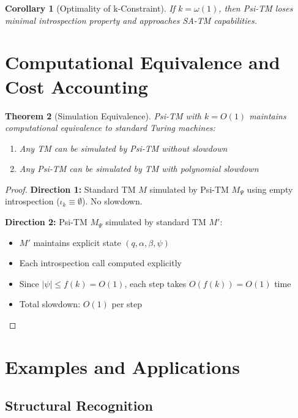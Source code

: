 \documentclass[11pt]{article}
\newtheorem{theorem}{Theorem}[section]
\newtheorem{corollary}[theorem]{Corollary}
\theoremstyle{plain}
\theoremstyle{definition}
\begin{document}
\begin{corollary}[Optimality of k-Constraint]
If $k = \omega(1)$, then Psi-TM loses minimal introspection property and approaches SA-TM capabilities.
\end{corollary}

\section{Computational Equivalence and Cost Accounting}

\begin{theorem}[Simulation Equivalence]
\label{thm:equivalence}
Psi-TM with $k = O(1)$ maintains computational equivalence to standard Turing machines:
\begin{enumerate}
\item Any TM can be simulated by Psi-TM without slowdown
\item Any Psi-TM can be simulated by TM with polynomial slowdown
\end{enumerate}
\end{theorem}

\begin{proof}
\textbf{Direction 1:} Standard TM $M$ simulated by Psi-TM $M_\Psi$ using empty introspection ($\iota_k \equiv \emptyset$). No slowdown.

\textbf{Direction 2:} Psi-TM $M_\Psi$ simulated by standard TM $M'$:
\begin{itemize}
\item $M'$ maintains explicit state $(q, \alpha, \beta, \psi)$ 
\item Each introspection call computed explicitly
\item Since $|\psi| \leq f(k) = O(1)$, each step takes $O(f(k)) = O(1)$ time
\item Total slowdown: $O(1)$ per step
\end{itemize}
\end{proof}


\section{Examples and Applications}

\subsection{Structural Recognition}
\end{document}
